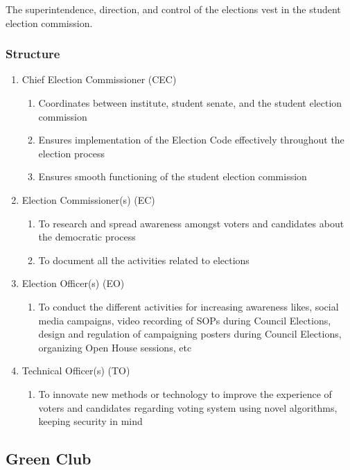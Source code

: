 \documentclass[12pt]{article}
\begin{document}
\noindent The superintendence, direction, and control of the elections vest in the student election commission.

\subsubsection{Structure}
\begin{enumerate}
    \item Chief Election Commissioner (CEC)
    \begin{enumerate}
        \item Coordinates between institute, student senate, and the student election commission
        \item Ensures implementation of the Election Code effectively throughout the election process
        \item Ensures smooth functioning of the student election commission
    \end{enumerate}
    \item Election Commissioner(s) (EC)
    \begin{enumerate}
        \item To research and spread awareness amongst voters and candidates about the democratic process
        \item To document all the activities related to elections
    \end{enumerate}
    \item Election Officer(s) (EO)
    \begin{enumerate}
        \item To conduct the different activities for increasing awareness likes, social media campaigns, video recording of SOPs during Council Elections, design and regulation of campaigning posters during Council Elections, organizing Open House sessions, etc
    \end{enumerate}
    \item Technical Officer(s) (TO)
    \begin{enumerate}
        \item To innovate new methods or technology to improve the experience of voters and candidates regarding voting system using novel algorithms, keeping security in mind
    \end{enumerate}
\end{enumerate}

\subsection{Green Club}
\end{document}
